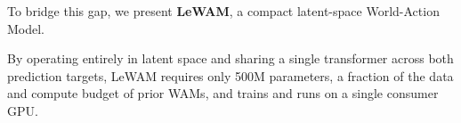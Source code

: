 To bridge this gap, we present \textbf{LeWAM}, a compact latent-space World-Action Model.


By operating entirely in latent space and sharing a single transformer across both prediction targets, LeWAM requires only 500M parameters, a fraction of the data and compute budget of prior WAMs, and trains and runs on a single consumer GPU.



 
 
